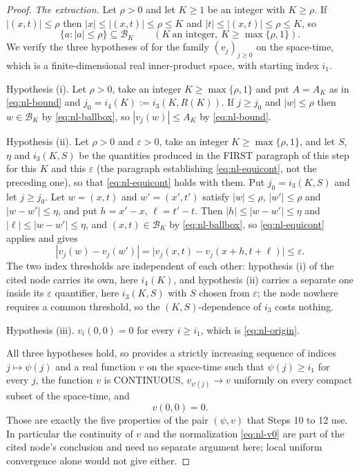 \begin{proof}
\emph{The extraction.} Let $\rho>0$ and let $K\ge1$ be an integer with
$K\ge\rho$. If $|(x,t)|\le\rho$ then $|x|\le|(x,t)|\le\rho\le K$ and
$|t|\le|(x,t)|\le\rho\le K$, so
\begin{equation}\label{eq:nl-ballbox}
  \{a:|a|\le\rho\}\subseteq\mathcal B_K
  \qquad(K\ \text{an integer},\ K\ge\max\{\rho,1\}).
\end{equation}
We verify the three hypotheses of
 for the family $(v_j)_{j\ge0}$ on the
space-time, which is a finite-dimensional real inner-product space, with starting
index $i_1$.

Hypothesis (i). Let $\rho>0$, take an integer $K\ge\max\{\rho,1\}$ and put
$A=A_K$ as in \eqref{eq:nl-bound} and $j_0=i_4(K):=i_3(K,R(K))$. If $j\ge j_0$
and $|w|\le\rho$ then $w\in\mathcal B_K$ by \eqref{eq:nl-ballbox}, so
$|v_j(w)|\le A_K$ by \eqref{eq:nl-bound}.

Hypothesis (ii). Let $\rho>0$ and $\varepsilon>0$, take an integer
$K\ge\max\{\rho,1\}$, and let $S$, $\eta$ and $i_3(K,S)$ be the quantities
produced in the FIRST paragraph of this step for this $K$ and this $\varepsilon$
(the paragraph establishing \eqref{eq:nl-equicont}, not the preceding one), so that
\eqref{eq:nl-equicont} holds with them. Put $j_0=i_3(K,S)$ and let $j\ge j_0$.
Let $w=(x,t)$ and $w'=(x',t')$ satisfy $|w|\le\rho$, $|w'|\le\rho$ and
$|w-w'|\le\eta$, and put $h=x'-x$, $\ell=t'-t$. Then $|h|\le|w-w'|\le\eta$ and
$|\ell|\le|w-w'|\le\eta$, and $(x,t)\in\mathcal B_K$ by \eqref{eq:nl-ballbox}, so
\eqref{eq:nl-equicont} applies and gives
\[
  |v_j(w)-v_j(w')|
   =\bigl|v_j(x,t)-v_j(x+h,t+\ell)\bigr|\le\varepsilon .
\]
The two index thresholds are independent of each other: hypothesis (i) of the cited
node carries its own, here $i_4(K)$, and hypothesis (ii) carries a separate one
inside its $\varepsilon$ quantifier, here $i_3(K,S)$ with $S$ chosen from
$\varepsilon$; the node nowhere requires a common threshold, so the
$(K,S)$-dependence of $i_3$ costs nothing.

Hypothesis (iii). $v_i(0,0)=0$ for every $i\ge i_1$, which is
\eqref{eq:nl-origin}.

All three hypotheses hold, so 
provides a strictly increasing sequence of indices $j\mapsto\psi(j)$ and a real
function $v$ on the space-time such that $\psi(j)\ge i_1$ for every $j$, the
function $v$ is CONTINUOUS, $v_{\psi(j)}\to v$ uniformly on every compact subset of
the space-time, and
\begin{equation}\label{eq:nl-v0}
  v(0,0)=0 .
\end{equation}
Those are exactly the five properties of the pair $(\psi,v)$ that Steps 10 to 12
use. In particular the continuity of $v$ and the normalization \eqref{eq:nl-v0} are
part of the cited node's conclusion and need no separate argument here; local
uniform convergence alone would not give either.


\end{proof}
